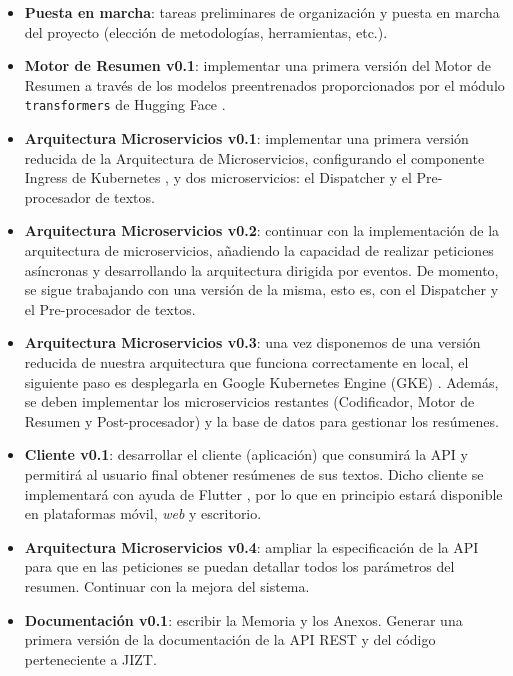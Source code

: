 \vspace{-0.3cm}
\begin{itemize}[\textbullet]
	\item \textbf{Puesta en marcha}: tareas preliminares de organización y puesta en marcha del proyecto (elección de metodologías, herramientas, etc.).

	\item \textbf{Motor de Resumen v0.1}: implementar una primera versión del Motor de Resumen a través de los modelos preentrenados proporcionados por el módulo \texttt{transformers} de Hugging Face \cite{transformers}.

	\item \textbf{Arquitectura Microservicios v0.1}: implementar una primera versión reducida de la Arquitectura de Microservicios, configurando el componente Ingress de Kubernetes \cite{ingress}, y dos microservicios: el Dispatcher y el Pre-procesador de textos.
	
	\item \textbf{Arquitectura Microservicios v0.2}: continuar con la implementación de la arquitectura de microservicios, añadiendo la capacidad de realizar peticiones asíncronas y desarrollando la arquitectura dirigida por eventos. De momento, se sigue trabajando con una versión de la misma, esto es, con el Dispatcher y el  Pre-procesador de textos.

	\item \textbf{Arquitectura Microservicios v0.3}: una vez disponemos de una versión reducida de nuestra arquitectura que funciona correctamente en local, el siguiente paso es desplegarla en Google Kubernetes Engine (GKE) \cite{gke}. Además, se deben implementar los microservicios restantes (Codificador, Motor de Resumen y Post-procesador) y la base de datos para gestionar los resúmenes.
	
	\item \textbf{Cliente v0.1}: desarrollar el cliente (aplicación) que consumirá la API y permitirá al usuario final obtener resúmenes de sus textos. Dicho cliente se implementará con ayuda de Flutter \cite{flutter-es}, por lo que en principio estará disponible en plataformas móvil, \emph{web} y escritorio.
	
	\item \textbf{Arquitectura Microservicios v0.4}: ampliar la especificación de la API para que en las peticiones se puedan detallar todos los parámetros del resumen. Continuar con la mejora del sistema.
	
	\item \textbf{Documentación v0.1}: escribir la Memoria y los Anexos. Generar una primera versión de la documentación de la API REST y del código perteneciente a JIZT.
\end{itemize}

